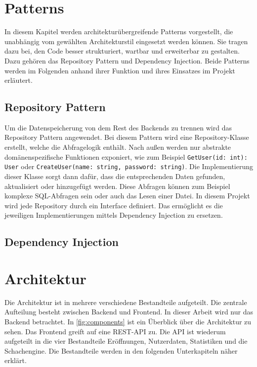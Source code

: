 \section{Patterns}
In diesem Kapitel werden architekturübergreifende Patterns vorgestellt, die unabhängig vom gewählten Architekturstil eingesetzt werden können. Sie tragen dazu bei, den Code besser strukturiert, wartbar und erweiterbar zu gestalten. Dazu gehören das Repository Pattern und Dependency Injection. Beide Patterns werden im Folgenden anhand ihrer Funktion und ihres Einsatzes im Projekt erläutert.

\subsection{Repository Pattern}
Um die Datenspeicherung von dem Rest des Backends zu trennen wird das Repository Pattern angewendet. Bei diesem Pattern wird eine Repository-Klasse erstellt, welche die Abfragelogik enthält. Nach außen werden nur abstrakte domänenspezifische Funktionen exponiert, wie zum Beispiel \lstinline{GetUser(id: int): User} oder \lstinline{CreateUser(name: string, password: string)}. Die Implementierung dieser Klasse sorgt dann dafür, dass die entsprechenden Daten gefunden, aktualisiert oder hinzugefügt werden. Diese Abfragen können zum Beispiel komplexe SQL-Abfragen sein oder auch das Lesen einer Datei. In diesem Projekt wird jede Repository durch ein Interface definiert. Das ermöglicht es die jeweiligen Implementierungen mittels Dependency Injection zu ersetzen. \cite{evans_domain-driven_2004}

\subsection{Dependency Injection}

\section{Architektur}
Die Architektur ist in mehrere verschiedene Bestandteile aufgeteilt. Die zentrale Aufteilung besteht zwischen Backend und Frontend. In dieser Arbeit wird nur das Backend betrachtet. In \autoref{fig:components} ist ein Überblick über die Architektur zu sehen. Das Frontend greift auf eine \ac{REST}-API zu.
Die API ist wiederum aufgeteilt in die vier Bestandteile Eröffnungen, Nutzerdaten, Statistiken und die Schachengine.
Die Bestandteile werden in den folgenden Unterkapiteln näher erklärt.

